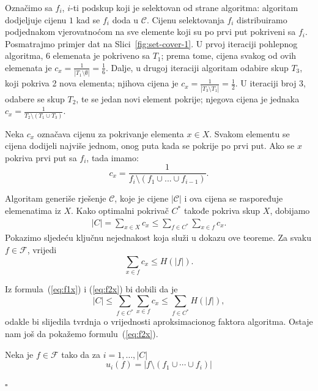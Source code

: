 \documentclass[a4paper, utf8, 11pt, colorlinks]{book}
\newenvironment{proof}{{Dokaz:}}{\hfill$\square$}
\begin{document}
\begin{proof}
	  Označimo sa $f_i$, $i$-ti podskup koji je selektovan od strane algoritma: algoritam dodjeljuje cijenu $1$ kad se $f_i$ doda u $\mathcal{C}$. 
	  Cijenu selektovanja $f_i$ distribuiramo podjednakom vjerovatnoćom na sve elemente koji su po prvi put pokriveni sa $f_i$. Posmatrajmo primjer dat na Slici~\ref{fig:set-cover-1}. U prvoj iteraciji pohlepnog algoritma,  
	  6 elemenata je pokriveno sa $T_1$; prema tome, cijena svakog od ovih elemenata je $c_x = \frac{1}{|T_1\setminus \emptyset|}= \frac{1}{6}$. Dalje, u drugoj iteraciji algoritam odabire skup $T_3$, koji pokriva 2 nova elementa; njihova cijena je $c_x=\frac{1}{|T_3 \setminus T_1|} = \frac{1}{2}$. U iteraciji broj 3, odabere se skup $T_2$, te se jedan novi element pokrije; njegova cijena je jednaka $c_x = \frac{1}{T_2 \setminus ( T_1 \cup T_3)}$. 
	 
	 Neka $ c_x$ označava cijenu za pokrivanje elementa $x\in X$.  Svakom elementu se cijena dodijeli najviše jednom, onog puta kada se pokrije po prvi put. Ako se $x$ pokriva prvi put sa $f_i$, tada imamo:
	 $$c_x = \frac{1}{f_i \setminus (f_1 \cup ...\cup f_{i-1})}.$$
	 
	 Algoritam generiše rješenje $\mathcal{C}$, koje je cijene $|\mathcal{C}|$ i ova cijena se raspoređuje elemenatima iz $X$. Kako optimalni pokrivač $C^*$ takođe pokriva skup $X$, dobijamo
	 \begin{align}\label{eq:f1x}
	 	|C| = \sum_{x \in X} c_x \leq \sum_{f \in C^*}\sum_{x \in f} c_x.
	 \end{align}
	  Pokazimo sljedeću ključnu nejednakost koja služi u dokazu ove teoreme. Za svaku $f \in \mathcal{F}$, vrijedi  
	 \begin{equation}\label{eq:f2x}
	 	\sum_{x \in f} c_x \leq H(|f|).
	 \end{equation}
	 
	 Iz formula~(\ref{eq:f1x}) i (\ref{eq:f2x}) bi dobili da je 
	 \begin{equation}
	 	|C| \leq \sum_{f \in C^*}\sum_{x \in f} c_x \leq \sum_{f \in C^*} H(|f|),
	 \end{equation}
	 odakle bi slijedila tvrdnja o vrijednosti aproksimacionog faktora algoritma.
	 Ostaje nam još da pokažemo formulu~(\ref{eq:f2x}). 
	 
	 Neka je $f\in \mathcal{F}$ tako da za $i=1,\ldots,|C|$
	 $$u_i(f) = |f \setminus (f_1 \cup \cdots \cup f_{i} )|$$
	 

\end{proof}
\end{document}
